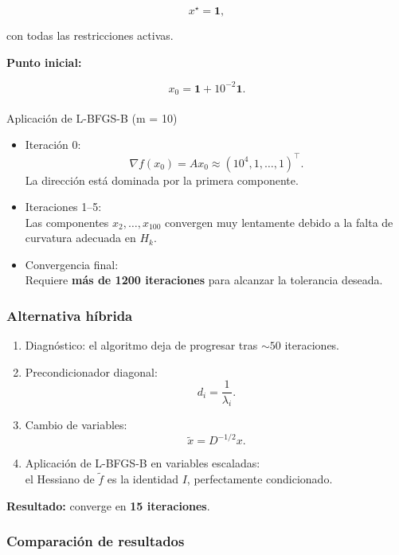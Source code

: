 \documentclass[
  spanish,
  us-letterpaper,
  DIV=11,
  numbers=noendperiod]{scrreprt}
\makeatletter
\let\oldparagraph\paragraph
\renewcommand{\paragraph}{
    \@ifstar
      \xxxParagraphStar
      \xxxParagraphNoStar
  }
\newcommand{\xxxParagraphStar}[1]{\oldparagraph*{#1}\mbox{}}
\newcommand{\xxxParagraphNoStar}[1]{\oldparagraph{#1}\mbox{}}
\providecommand{\tightlist}{%
  \setlength{\itemsep}{0pt}\setlength{\parskip}{0pt}}
\numberwithin{equation}{section}
\makeatother
\begin{document}
\[
x^\star = \mathbf{1},
\]

con todas las restricciones activas.

\textbf{Punto inicial:}

\[
x_0 = \mathbf{1} + 10^{-2}\mathbf{1}.
\]

\paragraph{Aplicación de L-BFGS-B (m =
10)}\label{aplicaciuxf3n-de-l-bfgs-b-m-10}

\begin{itemize}
\item
  Iteración 0:\\
  \[\nabla f(x_0) = A x_0 \approx (10^4, 1,\dots,1)^\top.\] La dirección
  está dominada por la primera componente.
\item
  Iteraciones 1--5:\\
  Las componentes \(x_2,\dots,x_{100}\) convergen muy lentamente debido
  a la falta de curvatura adecuada en \(H_k\).
\item
  Convergencia final:\\
  Requiere \textbf{más de 1200 iteraciones} para alcanzar la tolerancia
  deseada.
\end{itemize}

\subsubsection{Alternativa híbrida}\label{alternativa-huxedbrida}

\begin{enumerate}
\def\labelenumi{\arabic{enumi}.}
\tightlist
\item
  Diagnóstico: el algoritmo deja de progresar tras \(\sim 50\)
  iteraciones.\\
\item
  Precondicionador diagonal: \[
  d_i = \frac{1}{\lambda_i}.
  \]
\item
  Cambio de variables: \[
  \tilde{x} = D^{-1/2} x.
  \]
\item
  Aplicación de L-BFGS-B en variables escaladas:\\
  el Hessiano de \(\tilde{f}\) es la identidad \(I\), perfectamente
  condicionado.
\end{enumerate}

\textbf{Resultado:} converge en \textbf{15 iteraciones}.

\subsubsection{Comparación de
resultados}\label{comparaciuxf3n-de-resultados}
\end{document}

